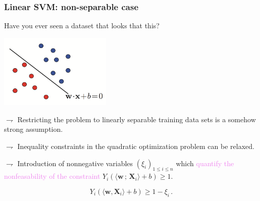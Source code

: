 \documentclass[9pt]{beamer}
\newcommand{\bw}{\textbf{w}}
\newcommand{\eqsp}{\,}
\newcommand{\bX}{\textbf{X}}
\newcommand{\inr}[1]{\langle #1 \rangle}
\begin{document}
\begin{frame}[t]
\frametitle{Linear SVM: non-separable case}

Have you ever seen a dataset that looks that this?
\begin{center}
\includegraphics[width=0.4\textwidth]{hyperplane.png}
\end{center}

$\rightharpoondown$ Restricting the problem to linearly separable  training data sets is a \alert{somehow strong assumption}.

$\rightharpoondown$ Inequality constraints in the quadratic optimization problem \alert{can be relaxed}.

$\rightharpoondown$ Introduction of nonnegative variables $(\xi_i)_{1\leqslant i \leqslant n}$ which \textcolor{violet}{quantify the nonfeasability of the constraint} $Y_i(\langle \bw\eqsp;\eqsp \bX_i\rangle + b)\geqslant 1$.

\begin{equation*}
Y_i (\inr{\bw, \bX_i} + b) \geqslant 1 - \xi_i\eqsp.
\end{equation*}

\end{frame}
\end{document}
